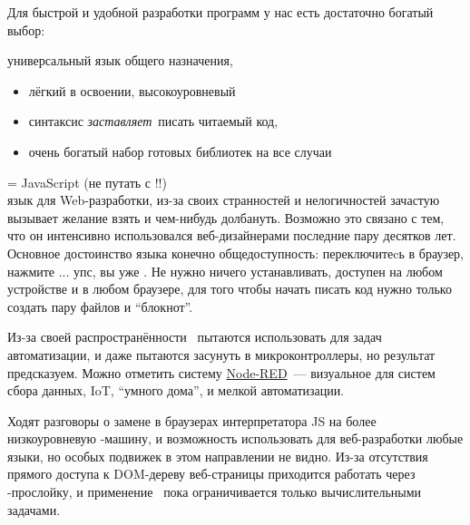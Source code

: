 
Для быстрой и удобной разработки программ у нас есть достаточно богатый выбор:

\begin{description}
    
\item[\py] универсальный язык общего назначения,
    \begin{itemize}[nosep]
        \item лёгкий в освоении, высокоуровневый
        \item синтаксис \textit{заставляет}\ писать читаемый код,
        \item очень богатый набор готовых библиотек на все случаи
    \end{itemize}

\item[\js] = JavaScript (не путать с \java !!)\\
    язык для Web-разработки, из-за своих странностей и нелогичностей зачастую
    вызывает желание взять и чем-нибудь долбануть. Возможно это связано с тем,
    что он интенсивно использовался веб-дизайнерами последние пару десятков лет.    
    Основное достоинство языка конечно общедоступность: переключитеcь в браузер,
    нажмите ... упс, вы уже \Smiley. Не нужно ничего
    устанавливать, доступен на любом устройстве и в любом браузере, для того
    чтобы начать писать код нужно только создать пару файлов и ``блокнот''.

    Из-за своей распространённости \js\ пытаются использовать для задач
    автоматизации, и даже пытаются засунуть в микроконтроллеры, но результат
    предсказуем. Можно отметить систему
    \href{https://habr.com/ru/company/yandex/blog/519600/}{Node-RED}\ ---
    визуальное  для систем сбора данных, IoT,
    ``умного дома'', и мелкой автоматизации.

\item{\wasm}    

    Ходят разговоры о замене в браузерах интерпретатора JS на более
    низкоуровневую -машину, и возможность использовать для
    веб-разработки любые языки, но особых подвижек в этом направлении не видно.
    Из-за отсутствия прямого доступа к DOM-дереву веб-страницы приходится
    работать через \js-прослойку, и применение \wasm\ пока ограничивается только
    вычислительными задачами.


\end{description}
